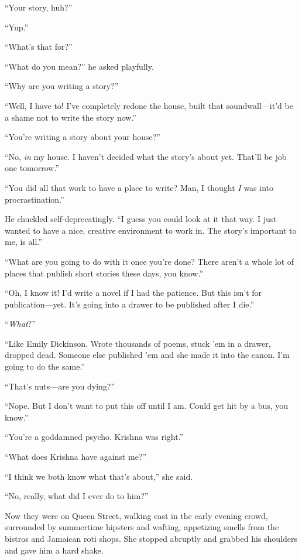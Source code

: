 \documentclass{article}
\begin{document}
``Your story, huh?''

``Yup.''

``What's that for?''

``What do you mean?'' he asked playfully.

``Why are you writing a story?''

``Well, I have to!  I've completely redone the house, built that
soundwall---it'd be a shame not to write the story now.''

``You're writing a story about your house?''

``No, \textit{in} my house.  I haven't decided what the story's about
yet.  That'll be job one tomorrow.''

``You did all that work to have a place to write?  Man, I thought
\textit{I} was into procrastination.''

He chuckled self-deprecatingly.  ``I guess you could look at it that
way.  I just wanted to have a nice, creative environment to work in. 
The story's important to me, is all.''

``What are you going to do with it once you're done?  There aren't a
whole lot of places that publish short stories these days, you know.''

``Oh, I know it!  I'd write a novel if I had the patience.  But this
isn't for publication---yet.  It's going into a drawer to be published
after I die.''

``\textit{What}?''

``Like Emily Dickinson.  Wrote thousands of poems, stuck 'em in a
drawer, dropped dead.  Someone else published 'em and she made it into
the canon.  I'm going to do the same.''

``That's nuts---are you dying?''

``Nope.  But I don't want to put this off until I am.  Could get hit
by a bus, you know.''

``You're a goddamned psycho.  Krishna was right.''

``What does Krishna have against me?''

``I think we both know what that's about,'' she said.

``No, really, what did I ever do to him?''

Now they were on Queen Street, walking east in the early evening
crowd, surrounded by summertime hipsters and wafting, appetizing
smells from the bistros and Jamaican roti shops.  She stopped abruptly
and grabbed his shoulders and gave him a hard shake.
\end{document}
